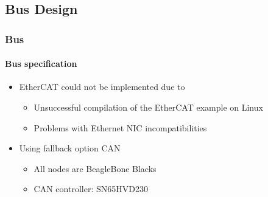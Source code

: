 \documentclass{beamer}
\begin{document}
%
%
%
%

\subsection{Bus Design}
\begin{frame}
  \frametitle{Bus}
  \framesubtitle{Bus specification}
  \begin{itemize}
    \item EtherCAT could not be implemented due to
		\begin{itemize}
			\item Unsuccessful compilation of the EtherCAT example on Linux
			\item Problems with Ethernet NIC incompatibilities 
		\end{itemize}
		\vfill
    \item Using fallback option CAN
		\begin{itemize}
			\item All nodes are BeagleBone Blacks
			\item CAN controller: SN65HVD230
		\end{itemize}
  \end{itemize}
\end{frame}
\end{document}
